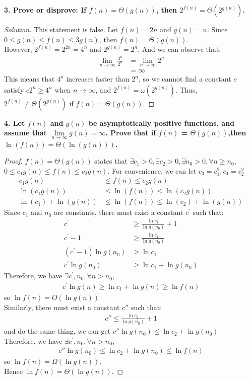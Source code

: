 \documentclass[12pt]{article}
\begin{document}
\noindent \textbf{3. Prove or disprove: If $f(n)=\Theta(g(n))$, then $2^{f(n)}=\Theta(2^{g(n)})$.
}

\begin{proof}[Solution] 	
\cite{tptf}This statement is false. Let $f(n) = 2n$ and $g(n) = n$. Since $0\le g(n)\le f(n)\le 3g(n)$, then $f(n) = \Theta(g(n))$.\\
However, $2^{f(n)} = 2^{2n} = 4^n$ and $2^{g(n)} = 2^n$. And we can observe that:
	\begin{align*}
		\lim\limits_{n\to \infty} \frac{4^n}{2^n}&=	\lim\limits_{n\to \infty} 2^n\\
		&=\infty
	\end{align*} 
This means that $4^n$ increases faster than $2^n$, so we cannot find a constant $c$ satisfy $c2^n\ge4^n$ when $n\to \infty$, and $2^{f(n)}=\omega(2^{g(n)})$. Thus, $2^{f(n)}\ne\Theta(2^{g(n)})$ if $f(n)=\Theta(g(n))$.
\end{proof}
\noindent \textbf{4. Let $f(n)$ and $g(n)$ be asymptotically positive functions, and assume that 
	$\lim\limits_{n\to \infty}g(n) = \infty$. Prove that 
	if $f(n)$ = $\Theta(g(n))$,then $\ln(f(n))=\Theta(\ln(g(n)))$.}
\begin{proof}
	$f(n)=\Theta(g(n))$ states that $\exists c_1>0, \exists c_2>0, \exists n_0>0, \forall n\ge n_0$, $0\le c_1g(n)\le f(n)\le c_2g(n)$. For convenience, we can let $c_3=c_1^2, c_4=c_2^2$\\
	\begin{align*}
		c_1g(n)&\le f(n)\le c_2g(n)\\
		\ln(c_1g(n))&\le \ln(f(n))\le \ln(c_2g(n))\\
		\ln(c_1)+\ln(g(n))&\le\ln(f(n))\le\ln(c_2)+\ln(g(n))
	\end{align*}
	Since $c_1$ and $n_0$ are constants, there must exist a constant $c^{\prime}$ such that:\cite{sb}
	\begin{align*}
		c^{\prime}&\ge \frac{\ln c_1}{\ln g(n_0)}+1\\
		c^{\prime}-1&\ge \frac{\ln c_1}{\ln g(n_0)}\\
		(c^{\prime}-1)\ln g(n_0)&\ge \ln c_1\\
		c^{\prime}\ln g(n_0)&\ge \ln c_1+\ln g(n_0)
	\end{align*}
	Therefore, we have $\exists c^{\prime},n_0,\forall n>n_0$,
	\begin{align*}
		c^{\prime}\ln g(n)\ge \ln c_1+\ln g(n)\ge \ln f(n)
	\end{align*}
	so $\ln f(n)=O(\ln g(n))$\\
	Similarly, there must exist a constant $c''$ such that:
	\begin{align*}
		c''\le \frac{\ln c_2}{\ln g(n_0)}+1
	\end{align*}
	and do the same thing, we can get $c''\ln g(n_0)\le \ln c_2+\ln g(n_0)$\\
	Therefore, we have $\exists c^{\prime},n_0,\forall n>n_0$,
	\begin{align*}
		c''\ln g(n_0)\le \ln c_2+\ln g(n_0)\le \ln f(n)
	\end{align*}
	so $\ln f(n)=\Omega(\ln g(n))$.\\
	Hence $\ln f(n)=\Theta(\ln g(n))$.
\end{proof}
\end{document}
